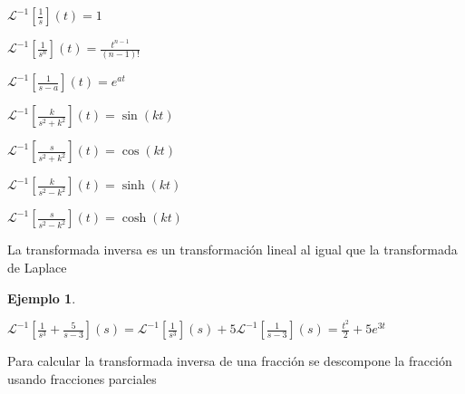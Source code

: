 \documentclass{article}
\theoremstyle{plain}
\theoremstyle{definition}
\newtheorem{ejem}[thm]{Ejemplo}
\begin{document}
\begin{center}
$\displaystyle \mathcal{L}^{-1}\left[ \frac{1}{s} \right] (t) = 1$
\end{center}


\begin{center}
$\displaystyle \mathcal{L}^{-1}\left[ \frac{1}{s^n} \right] (t) = \frac{t^{n-1}}{(n-1)!}$
\end{center}

\begin{center}
$\displaystyle \mathcal{L}^{-1}\left[ \frac{1}{s-a} \right] (t) = e^{at}$
\end{center}


\begin{center}
$\displaystyle \mathcal{L}^{-1}\left[ \frac{k}{s^2+k^2} \right] (t) = \sin(kt)$
\end{center}



\begin{center}
$\displaystyle \mathcal{L}^{-1}\left[ \frac{s}{s^2+k^2} \right] (t) = \cos(kt)$
\end{center}

\begin{center}
$\displaystyle \mathcal{L}^{-1}\left[ \frac{k}{s^2-k^2} \right] (t) = \sinh(kt)$
\end{center}

\begin{center}
$\displaystyle \mathcal{L}^{-1}\left[ \frac{s}{s^2-k^2} \right] (t) = \cosh(kt)$
\end{center}


\newpage



La transformada inversa es un transformación lineal al igual que la transformada de Laplace \\

\begin{ejem}
\end{ejem}


\begin{center}
$\displaystyle \mathcal{L}^{-1}\left[ \frac{1}{s^3} + \frac{5}{s-3}\right](s)= \mathcal{L}^{-1}\left[ \frac{1}{s^3}\right](s) + 5\mathcal{L}^{-1} \left[ \frac{1}{s-3}\right](s) = \frac{t^2}{2} + 5e^{3t}$
\end{center}



Para calcular la transformada inversa de una fracción se descompone la fracción usando fracciones parciales \\
\end{document}
